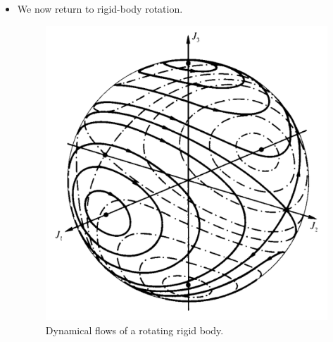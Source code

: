 \documentclass[../notes.tex]{subfiles}
\begin{document}
\begin{itemize}
\begin{figure}[h!]
\begin{subfigure}[b]{0.3\linewidth}
            \caption{Bifurcation diagram.}
            \label{fig:bifurPitchforkc}
        \end{subfigure}
        \caption{Pitchfork bifurcation.}
        \label{fig:bifurPitchfork}
    \end{figure}
    \begin{itemize}
        \item Consider a potential well of the form
        \begin{equation*}
            V(x) = \frac{S}{2}x^2+ux^4
        \end{equation*}
        \item There are two important cases here.
        \begin{enumerate}
            \item If $S>0$, we get a single well (see Figure \ref{fig:bifurPitchforka}).
            \item If $S<0$, then the well divides into two (see Figure \ref{fig:bifruPitchforkb}).
        \end{enumerate}
        \item The particle always wants to slide toward the minimum potential energy, so in the first case, we have on stable branch, and in the second case, we develop three stable branches and one unstable branch. See Figure \ref{fig:bifurPitchforkc}.
    \end{itemize}
    \item We now return to rigid-body rotation.
    \begin{figure}[h!]
        \centering
        \includegraphics[width=0.4\linewidth]{../ExtFiles/flowsRigid.png}
        \caption{Dynamical flows of a rotating rigid body.}
        \label{fig:flowsRigid}
    \end{figure}

\end{itemize}
\end{document}
